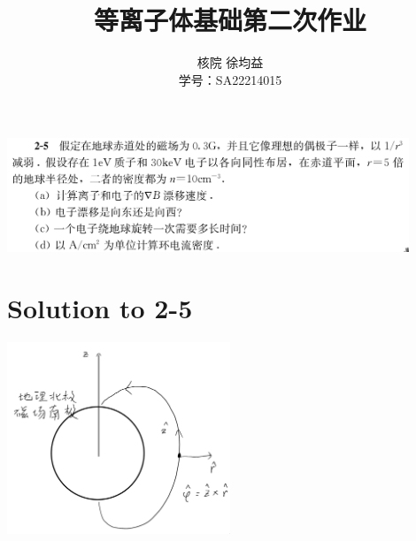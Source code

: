 

\title{等离子体基础第二次作业}
\author{核院 徐均益 \\ 学号：SA22214015}

\maketitle

\includegraphics[width=0.9\textwidth]{figures/2022-09-30T114621+0800.png}

\section{Solution to 2-5}
\includegraphics[width=0.5\textwidth]{figures/2022-09-30T114803+0800.png} \\

